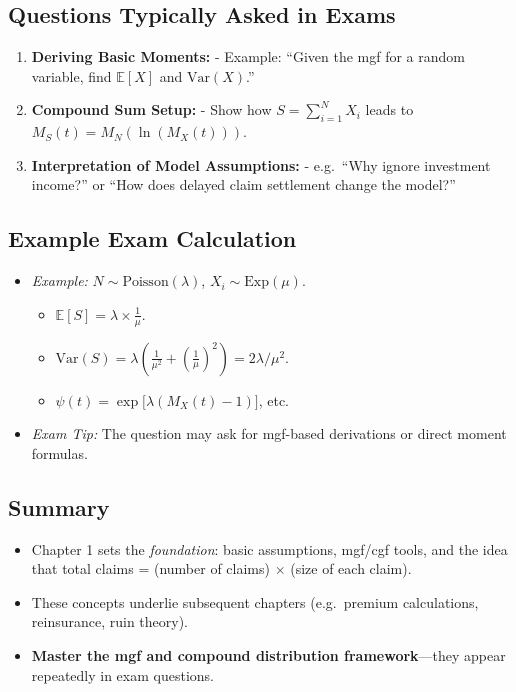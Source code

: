\documentclass[13pt,a4paper]{article}
\begin{document}
\subsection{Questions Typically Asked in Exams}
\begin{enumerate}
  \item \textbf{Deriving Basic Moments:}  
    - Example: “Given the mgf for a random variable, find \(\mathbb{E}[X]\) and \(\mathrm{Var}(X)\).”
  \item \textbf{Compound Sum Setup:}
    - Show how \(S=\sum_{i=1}^{N} X_i\) leads to \(M_S(t)=M_N(\ln(M_X(t)))\).
  \item \textbf{Interpretation of Model Assumptions:}
    - e.g.\ “Why ignore investment income?” or “How does delayed claim settlement change the model?”
\end{enumerate}

\subsection{Example Exam Calculation}
\begin{itemize}
  \item \emph{Example:} \(N\sim\mathrm{Poisson}(\lambda)\), \(X_i\sim\mathrm{Exp}(\mu)\). 
  \begin{itemize}
    \item \(\mathbb{E}[S]=\lambda \times \tfrac{1}{\mu}\).
    \item \(\mathrm{Var}(S)=\lambda \left(\frac{1}{\mu^2} + \left(\frac{1}{\mu}\right)^2\right)=2\lambda/\mu^2.\)
    \item \(\psi(t)=\exp\bigl[\lambda(M_X(t)-1)\bigr]\), etc.
  \end{itemize}
  \item \emph{Exam Tip:} The question may ask for mgf-based derivations or direct moment formulas.
\end{itemize}

\subsection{Summary}
\begin{itemize}
  \item Chapter 1 sets the \emph{foundation}: basic assumptions, mgf/cgf tools, and the idea that total claims = (number of claims) \(\times\) (size of each claim).
  \item These concepts underlie subsequent chapters (e.g.\ premium calculations, reinsurance, ruin theory).
  \item \textbf{Master the mgf and compound distribution framework}—they appear repeatedly in exam questions.
\end{itemize}
\end{document}
